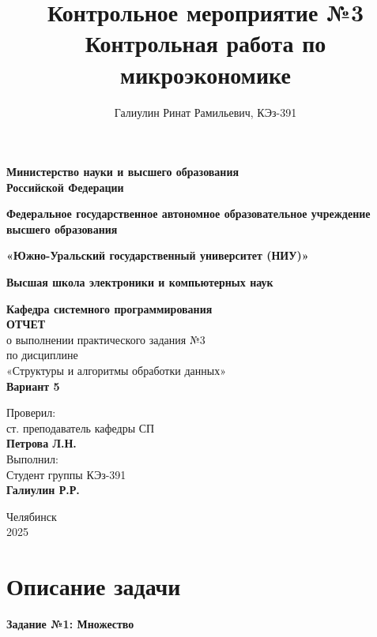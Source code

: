 \documentclass[a4paper,12pt]{article}
\title{\textbf{Контрольное мероприятие №3} \\
	Контрольная работа по микроэкономике }
\author{Галиулин Ринат Рамильевич, КЭз-391}
\date{}
\begin{document}
	\begin{titlepage}
		\begin{center}
			{\large \textbf{Министерство науки и высшего образования \\ Российской Федерации}}
			
			{\large\textbf{Федеральное государственное автономное образовательное учреждение высшего образования}}
			
			{\large \textbf{«Южно-Уральский государственный университет (НИУ)»}}
			
			{\large \textbf{Высшая школа электроники и компьютерных наук}}
			
			{\large \textbf{Кафедра системного программирования}\\[2cm]
			}
			\textbf{ОТЧЕТ}\\[0.2cm]
			о выполнении практического задания №3\\[0.2cm]
			по дисциплине\\[0.2cm]
			«Структуры и алгоритмы обработки данных»\\[0.2cm]
			\textbf{Вариант 5}\\[3cm]
		\end{center}
		
		\begin{flushright}
			Проверил:\\[0.2cm]
			ст. преподаватель кафедры СП\\[0.2cm]
			\textbf{Петрова Л.Н.}\\[1cm]
						
			Выполнил:\\[0.2cm]
			Студент группы КЭз-391\\[0.2cm]
			\textbf{Галиулин Р.Р.}\\[0.2cm]
			
		\end{flushright}
		\vfill{}
		
		\begin{center}
			Челябинск \\ 2025
		\end{center}
	\end{titlepage}
	\newpage
	
	\tableofcontents
	
	\setcounter{page}{2}
	\newpage
	\section{Описание задачи}
	\textbf{Задание №1: Множество}
	
\end{document}
